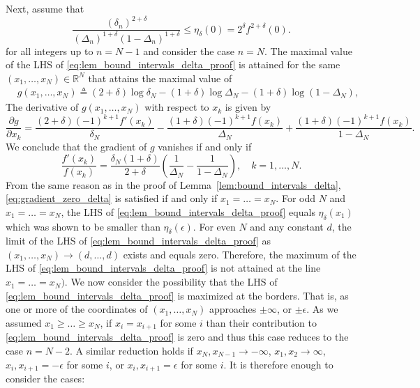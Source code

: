 \documentclass[letterpaper, 11pt]{IEEEtran}      %
\begin{document}
Next, assume that 
\begin{equation}
\frac{ \left( \delta_n \right)^{2+\delta}} 
{\left(\Delta_n \right)^{1+\delta}\left(1- \Delta_n \right)^{1+\delta} } \leq \eta_\delta(0) = 2^\delta f^{2+\delta}(0) . 
\label{eq:lem_bound_intervals_delta_proof}
\end{equation}
for all integers up to $n = N-1$ and consider the case $n = N$. 
%
The maximal value of the LHS of \eqref{eq:lem_bound_intervals_delta_proof} is attained for the same $(x_1,\ldots,x_N) \in \mathbb R^N$ that attains the maximal value of 
\begin{align*}
& g(x_1,\ldots, x_N) \triangleq  (2+\delta) \log \delta_N - (1+\delta) \log \Delta_N - (1+\delta) \log \left(1 - \Delta_N  \right),
\end{align*}
 The derivative of $g(x_1,\ldots,x_N)$ with respect to $x_k$ is given by
\[
\frac{\partial  g}{\partial x_k} = \frac{(2+\delta) (-1)^{k+1} f'(x_k)}{\delta_N} -\frac{(1+\delta)(-1)^{k+1} f(x_k)}{\Delta_N } + \frac{(1+\delta)(-1)^{k+1} f(x_k)}{1-\Delta_N }.
\]
We conclude that the gradient of $g$ vanishes if and only if
\begin{equation}
\label{eq:gradient_zero_delta}
\frac{f'(x_k)}{f(x_k)} = \frac{\delta_N(1+\delta)}{2+\delta} \left( \frac{1}{\Delta_N} - \frac{1}{1-\Delta_N} \right),\quad k=1,\ldots,N.
\end{equation}
From the same reason as in the proof of Lemma~\ref{lem:bound_intervals_delta}, \eqref{eq:gradient_zero_delta} is satisfied if and only if $x_1 = \ldots = x_N$. For odd $N$ and $x_1=\ldots =x_N$, the LHS of \eqref{eq:lem_bound_intervals_delta_proof} equals $\eta_\delta(x_1)$ which was shown to be smaller than $\eta_\delta(\epsilon)$. For even $N$ and any constant $d$, the limit of the LHS of \eqref{eq:lem_bound_intervals_delta_proof} as $(x_1,\ldots,x_N)\rightarrow (d,\ldots,d)$ exists and equals zero. Therefore, the maximum of the LHS of \eqref{eq:lem_bound_intervals_delta_proof} is not attained at the line $x_1=\ldots=x_N)$. We now consider the possibility that the LHS of \eqref{eq:lem_bound_intervals_delta_proof} is maximized at the borders. That is, as one or more of the coordinates of $(x_1,\ldots,x_N)$ approaches $\pm \infty$,  or $\pm \epsilon$. As we assumed $x_1 \geq \ldots \geq x_N$, if $x_i = x_{i+1}$ for some $i$ than their contribution to \eqref{eq:lem_bound_intervals_delta_proof} is zero and thus this case reduces to the case $n= N-2$. A similar reduction holds if $x_N, x_{N-1} \to -\infty$, $x_1, x_2 \to \infty$,  $x_i, x_{i+1} = -\epsilon$ for some $i$, or $x_i, x_{i+1} = \epsilon$ for some $i$. It is therefore enough to consider the cases:
\end{document}
